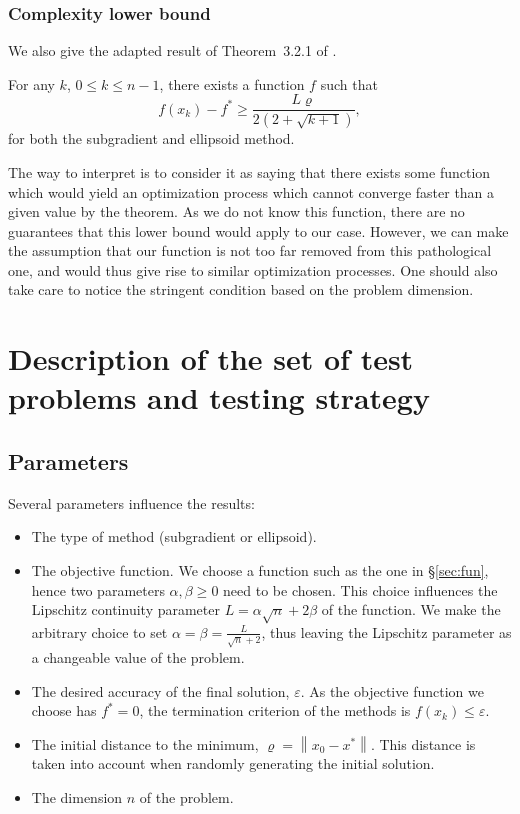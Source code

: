 \documentclass[final]{aomart}
\newcommand{\xk}{x_k}
\newcommand{\xopt}{x^*}
\newcommand{\fopt}{f^*}
\newtheorem[{}\it]{thm}{Theorem}[section]
\theoremstyle{definition}
\newtheorem*[{}\it]{notation}{Notation}
\numberwithin{equation}{section}
\newcommand{\secref}[1]{\S\ref{#1}}
\renewcommand{\epsilon}{\varepsilon}
\renewcommand{\rho}{\varrho}
\newcommand{\enVert}[1]{\left\lVert#1\right\rVert}
\let\norm=\enVert
\begin{document}
\subsubsection{Complexity lower bound}
We also give the adapted result of Theorem~3.2.1 of \cite{Nesterov2018}.
\begin{thm}
	\label{thm:3.2.1}
	For any \(k\), \(0 \leqslant k \leqslant n-1\), there exists a function \(f\) such that
	\begin{equation}
	f(\xk) - \fopt \geqslant \frac{L \rho}{2 (2 + \sqrt{k+1})},
	\end{equation}
	for both the subgradient and ellipsoid method.
\end{thm}
The way to interpret is to consider it as saying that there exists some function which would yield an optimization process which cannot converge faster than a given value by the theorem.
As we do not know this function, there are no guarantees that this lower bound would apply to our case. However, we can make the assumption that our function is not too far removed from this pathological one, and would thus give rise to similar optimization processes.
One should also take care to notice the stringent condition based on the problem dimension.

\section{Description of the set of test problems and testing strategy}
\label{sec:desc_test}

\subsection{Parameters}
\label{sec:param}
Several parameters influence the results:
\begin{itemize}
	\item The type of method (subgradient or ellipsoid).
	\item The objective function.
	We choose a function such as the one in \secref{sec:fun}, hence two parameters \(\alpha, \beta \geqslant 0\) need to be chosen.
	This choice influences the Lipschitz continuity parameter \(L = \alpha \sqrt{n} + 2\beta\) of the function.
	We make the arbitrary choice to set \(\alpha = \beta = \frac{L}{\sqrt{n} + 2}\), thus leaving the Lipschitz parameter as a changeable value of the problem.
	\item The desired accuracy of the final solution, \(\epsilon\).
	As the objective function we choose has \(f^* = 0\), the termination criterion of the methods is \(f(\xk) \leqslant \epsilon\).
	\item The initial distance to the minimum, \(\rho = \norm{x_0 - \xopt}\).
	This distance is taken into account when randomly generating the initial solution.
	\item The dimension \(n\) of the problem.
\end{itemize}
\end{document}
